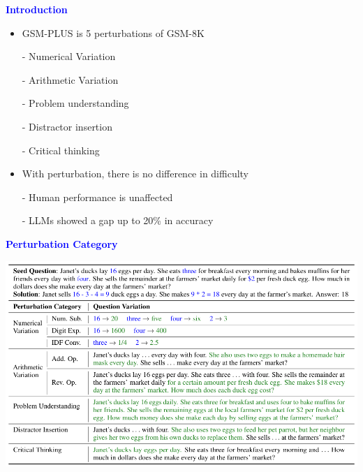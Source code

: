 \documentclass[professionalfont]{beamer}
\begin{document}
\begin{frame}
\begin{center}
    { \textbf{\textcolor{blue}{ {\fontsize{12}{14}\selectfont Introduction} }} }
\end{center}

{\fontsize{10}{14}\selectfont 
\begin{itemize}
    \item GSM-PLUS is 5 perturbations of GSM-8K
    
    - Numerical Variation
    
    - Arithmetic Variation
    
    - Problem understanding
    
    - Distractor insertion
    
    - Critical thinking
\end{itemize}

\begin{itemize}
    \item With perturbation, there is no difference in difficulty
    
    - Human performance is unaffected
    
    - LLMs showed a gap up to 20\% in accuracy
\end{itemize}
}

\end{frame}

\begin{frame}
\begin{center}
    { \textbf{\textcolor{blue}{ {\fontsize{12}{14}\selectfont Perturbation Category} }} }
\end{center}

\begin{center}
    \includegraphics[width=1.0\textwidth]{table2.png}
\end{center}

\end{frame}
\end{document}
